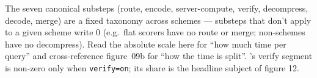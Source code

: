 The seven canonical substeps (\textsf{route, encode,
server-compute, verify, decompress, decode, merge}) are a fixed
taxonomy across schemes --- substeps that don't apply to a given
scheme write 0 (e.g.\ flat scorers have no \textsf{route} or
\textsf{merge}; non-\tiptoe schemes have no \textsf{decompress}).
Read the absolute scale here for ``how much time per query'' and
cross-reference figure~09b for ``how the time is split''. \bntm's
\textsf{verify} segment is non-zero only when \texttt{verify=on};
its share is the headline subject of figure 12.
